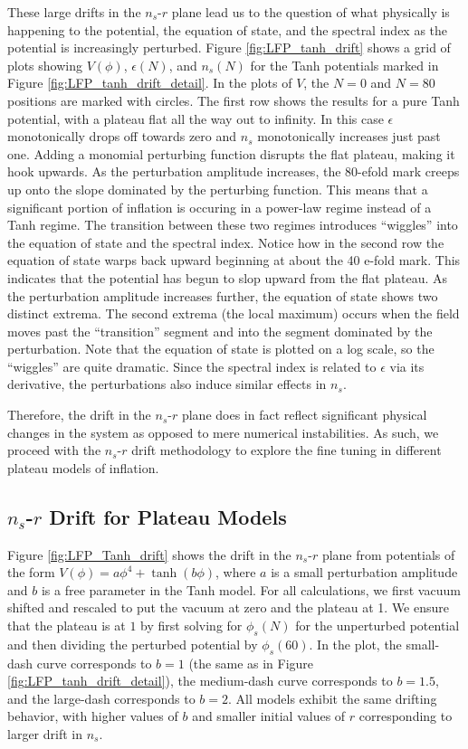 \documentclass[a4paper,11pt]{article}
\def\nsr{$n_s$-$r$ }
\begin{document}
These large drifts in the \nsr plane lead us to the question of what physically is happening to the potential, the equation of state, and the spectral index as the potential is increasingly perturbed. Figure \ref{fig:LFP_tanh_drift} shows a grid of plots showing $V(\phi)$, $\epsilon(N)$, and $n_s(N)$ for the Tanh potentials marked in Figure \ref{fig:LFP_tanh_drift_detail}. In the plots of $V$, the $N=0$ and $N=80$ positions are marked with circles. The first row shows the results for a pure Tanh potential, with a plateau flat all the way out to infinity. In this case $\epsilon$ monotonically drops off towards zero and $n_s$ monotonically increases just past one. Adding a monomial perturbing function disrupts the flat plateau, making it hook upwards. As the perturbation amplitude increases, the 80-efold mark creeps up onto the slope dominated by the perturbing function. This means that a significant portion of inflation is occuring in a power-law regime instead of a Tanh regime. The transition between these two regimes introduces ``wiggles'' into the equation of state and the spectral index. Notice how in the second row the equation of state warps back upward beginning at about the 40 e-fold mark. This indicates that the potential has begun to slop upward from the flat plateau. As the perturbation amplitude increases further, the equation of state shows two distinct extrema. The second extrema (the local maximum) occurs when the field moves past the ``transition'' segment and into the segment dominated by the perturbation. Note that the equation of state is plotted on a log scale, so the ``wiggles'' are quite dramatic. Since the spectral index is related to $\epsilon$ via its derivative, the perturbations also induce similar effects in $n_s$. 

Therefore, the drift in the \nsr plane does in fact reflect significant physical changes in the system as opposed to mere numerical instabilities. As such, we proceed with the \nsr drift methodology to explore the fine tuning in different plateau models of inflation. 


\subsection{\nsr Drift for Plateau Models}
\label{ssec:DriftResults}

Figure \ref{fig:LFP_Tanh_drift} shows the drift in the \nsr plane from potentials of the form $V(\phi)=a\phi^4+\tanh(b\phi)$, where $a$ is a small perturbation amplitude and $b$ is a free parameter in the Tanh model. For all calculations, we first vacuum shifted and rescaled to put the vacuum at zero and the plateau at 1. We ensure that the plateau is at $1$ by first solving for $\phi_s(N)$ for the unperturbed potential and then dividing the perturbed potential by $\phi_s(60)$. In the plot, the small-dash curve corresponds to $b=1$ (the same as in Figure \ref{fig:LFP_tanh_drift_detail}), the medium-dash curve corresponds to $b=1.5$, and the large-dash corresponds to $b=2$. All models exhibit the same drifting behavior, with higher values of $b$ and smaller initial values of $r$ corresponding to larger drift in $n_s$. 
\end{document}
